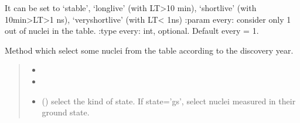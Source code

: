 \documentclass[letterpaper,10pt,english]{sphinxmanual}
\begin{document}
\begin{fulllineitems}
\begin{fulllineitems}
\begin{quote}
\begin{description}
\begin{itemize}
\end{itemize}

\end{description}\end{quote}

\sphinxAtStartPar
It can be set to ‘stable’, ‘longlive’ (with LT\textgreater{}10 min), ‘shortlive’ (with 10min\textgreater{}LT\textgreater{}1 ns),         ‘veryshortlive’ (with LT\textless{} 1ns)
:param every: consider only 1 out of  nuclei in the table.
:type every: int, optional. Default every = 1.

\end{fulllineitems}


\begin{fulllineitems}
\label{\detokenize{source/api/setup_masses:nucleardatapy.setup_masses.SetupMasses.select_year}}
\pysigstartsignatures
{}
\pysigstopsignatures
\sphinxAtStartPar
Method which select some nuclei from the table according to the discovery year.
\begin{quote}\begin{description}
\begin{itemize}
\item {} 
\sphinxAtStartPar
{} \textendash{} 

\item {} 
\sphinxAtStartPar
{} \textendash{} 

\item {} 
\sphinxAtStartPar
{} (\sphinxstyleliteralemphasis{\sphinxupquote{, }}) \textendash{} select the kind of state. If state=’gs’, select nuclei measured in their ground state.

\end{itemize}


\end{description}
\end{quote}
\end{fulllineitems}
\end{fulllineitems}
\end{document}
